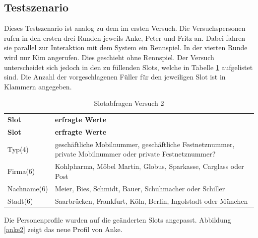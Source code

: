 \documentclass[12pt,a4paper]{scrartcl}
\begin{document}
\subsection{Testszenario}
Dieses Testszenario ist analog zu dem im ersten Versuch. Die Versuchspersonen rufen in den ersten drei Runden jeweils Anke, Peter und Fritz an. Dabei fahren sie parallel zur Interaktion mit dem System ein Rennspiel. In der vierten Runde wird nur Kim angerufen. Dies geschieht ohne Rennspiel. Der Versuch unterscheidet sich jedoch in den zu füllenden Slots, welche in Tabelle \ref{slots2} aufgelistet sind. Die Anzahl der vorgeschlagenen Füller für den jeweiligen Slot ist in Klammern angegeben.
\newpage


\begin{longtable}{p{4cm}p{10cm}}
	\label{slots2}\\
	\caption[Slotabfragen Versuch 2]{Slotabfragen Versuch 2}\\
	\hline
	\textbf{Slot} &\textbf{erfragte Werte}\\
	\hline
	\endfirsthead
	\hline
	\textbf{Slot} &	\textbf{erfragte Werte}\\
	\hline
	\endhead
Typ(4) & geschäftliche Mobilnummer, geschäftliche Festnetznummer, private Mobilnummer oder private Festnetznummer?\\
Firma(6) & Kohlpharma, Möbel Martin, Globus, Sparkasse, Carglass oder Post\\
Nachname(6) & Meier, Bies, Schmidt, Bauer, Schuhmacher oder Schiller \\
Stadt(6) & Saarbrücken, Frankfurt, Köln, Berlin, Ingolstadt oder München\\
\hline
\end{longtable}
\newpage

Die Personenprofile wurden auf die geänderten Slots angepasst. Abbildung \ref{anke2} zeigt das neue Profil von Anke. 
\end{document}
